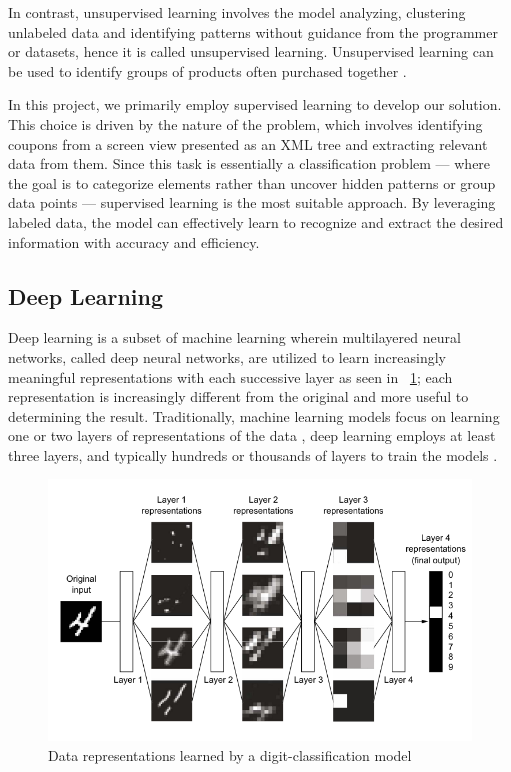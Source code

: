 \documentclass[licencjacka,en]{pracamgr}
\begin{document}
In contrast, unsupervised learning involves the model analyzing, clustering unlabeled data and identifying patterns without guidance from the programmer or datasets, hence it is called unsupervised learning. Unsupervised learning can be used to identify groups of products often purchased together \cite{supervised_ibm}.

In this project, we primarily employ supervised learning to develop our solution. This choice is driven by the nature of the problem, which involves identifying coupons from a screen view presented as an XML tree and extracting relevant data from them. Since this task is essentially a classification problem — where the goal is to categorize elements rather than uncover hidden patterns or group data points — supervised learning is the most suitable approach. By leveraging labeled data, the model can effectively learn to recognize and extract the desired information with accuracy and efficiency.

\subsection{Deep Learning}
Deep learning is a subset of machine learning wherein multilayered neural networks, called deep neural networks, are utilized to learn increasingly meaningful representations with each successive layer as seen in ~\ref{fig:nn_simple}; each representation is increasingly different from the original and more useful to determining the result. Traditionally, machine learning models focus on learning one or two layers of representations of the data \cite{francuz}, deep learning employs at least three layers, and typically hundreds or thousands of layers to train the models \cite{ibm_dl}.

\begin{figure}
    \centering
    \includegraphics[width=0.5\linewidth]{bachelor_images/nn_simple.png}
    \caption{Data representations learned by a digit-classification model \cite{francuz}}
    \label{fig:nn_simple}
\end{figure}
\end{document}
